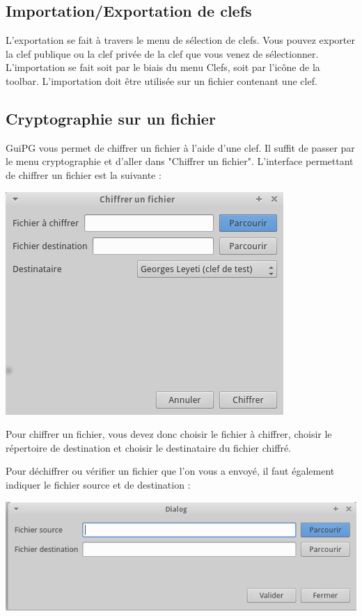 \documentclass[a4paper,11pt,french]{article}
\begin{document}
\subsection{Importation/Exportation de clefs}
L'exportation se fait à travers le menu de sélection de clefs. Vous pouvez exporter la clef publique ou la clef privée de la clef que vous venez de sélectionner.
L'importation se fait soit par le biais du menu Clefs, soit par l'icône de la toolbar. L'importation doit être utilisée sur un fichier contenant une clef.

\subsection{Cryptographie sur un fichier}

GuiPG vous permet de chiffrer un fichier à l'aide d'une clef. Il suffit de passer par le menu cryptographie et d'aller dans "Chiffrer un fichier".
L'interface permettant de chiffrer un fichier est la suivante :

\bigbreak
\bigbreak

\includegraphics[scale=0.5]{chiffrer.png} \bigbreak

Pour chiffrer un fichier, vous devez donc choisir le fichier à chiffrer, choisir le répertoire de destination et choisir le destinataire du fichier chiffré.

Pour déchiffrer ou vérifier un fichier que l'on vous a envoyé, il faut également indiquer le fichier source et de destination : 

\bigbreak
\bigbreak

\includegraphics[scale=0.5]{dechiffrer.png} \bigbreak
\end{document}
